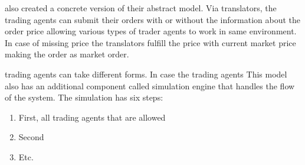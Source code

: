 \citeauthor{Julien07} also created a concrete version of their abstract model.
Via translators, the trading agents can submit their orders with or without 
the information about the order price allowing various types of trader agents 
to work in same environment. In case of missing price the translators fulfill 
the price with current market price making the order as market order. 

trading agents can 
take different forms. In case the trading agents 
This model also has an additional component called simulation engine that handles
the flow of the system. The simulation has six steps:
\begin{enumerate}
    \item First, all trading agents that are allowed 
    \item Second
    \item Etc.
\end{enumerate}